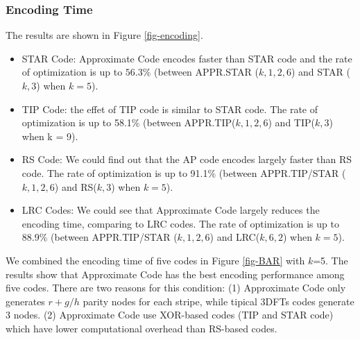 \documentclass[sigconf]{acmart}
\begin{document}
\subsubsection{Encoding Time}
The results are shown in Figure \ref{fig-encoding}.
\begin{itemize}
    \item STAR Code: Approximate Code encodes faster than STAR code and the rate of optimization is up to $56.3\%$ (between APPR.STAR ($k,1,2,6$) and STAR ($k,3$) when $k = 5$).

    \item TIP Code: the effet of TIP code is similar to STAR code. The rate of optimization is up to 58.1\% (between APPR.TIP($k,1,2,6$) and TIP($k,3$) when k = 9).

    \item RS Code: We could find out that the AP code encodes largely faster than RS code. The rate of optimization is up to 91.1\% (between APPR.TIP/STAR ($k,1,2,6$) and RS($k,3$) when $k = 5$).

    \item LRC Codes: We could see that Approximate Code largely reduces the encoding time, comparing to LRC codes. The rate of optimization is up to 88.9\% (between APPR.TIP/STAR ($k,1,2,6$) and LRC($k, 6, 2$) when $k = 5$).
\end{itemize}

We combined the encoding time of five codes in Figure \ref{fig-BAR} with $k$=5. The results show that Approximate Code has the best encoding performance among five codes. There are two reasons for this condition: (1) Approximate Code only generates $r+g/h$ parity nodes for each stripe, while tipical 3DFTs codes generate 3 nodes. (2) Approximate Code use XOR-based codes (TIP and STAR code) which have lower computational overhead than RS-based codes.\par
\end{document}
